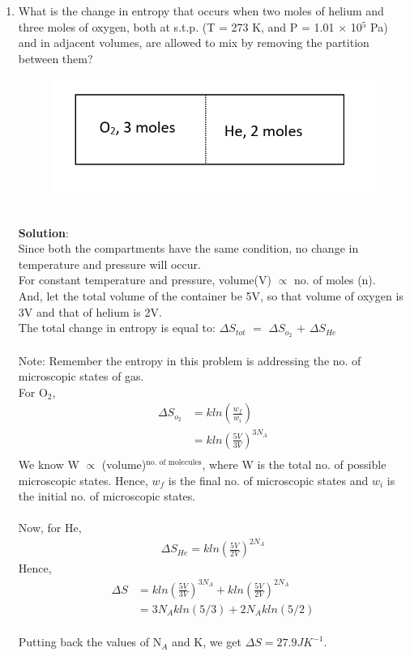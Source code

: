 \begin{enumerate}
\item What is the change in entropy that occurs when two moles of helium and three moles of oxygen, both at s.t.p. (T = 273 K, and P = 1.01 $\times$ 10$^5$ Pa) and in adjacent volumes, are allowed to mix by removing the partition between them? \\
\begin{figure}[htp]
    \centering
    \includegraphics{figures/thermo/thermo3.2.PNG}
    \caption{}
    \label{fig:thermo3.2}
\end{figure}
\\
\textbf{Solution}:\\
Since both the compartments have the same condition, no change in temperature and pressure will occur. \\
For constant temperature and pressure, volume(V) $\propto$ no. of moles (n).\\ 
And, let the total volume of the container be 5V, so that volume of oxygen is 3V and that of helium is 2V. \\
The total change in entropy is equal to:
$\Delta S_{tot}$ $=$ $\Delta$$S_{o_2}$ $+$ $\Delta S_{He}$\\\\
Note: Remember the entropy in this problem is addressing the no. of microscopic states of gas.\\
For O$_2$, \\
\begin{align*}
    \Delta S_{o_2}
    &= kln\left(\frac{w_f}{w_i}\right)\\
    &= kln\left(\frac{5V}{3V}\right)^{3N_A}\\
\end{align*}
We know W $\propto$ (volume)$^\text{no. of molecules}$, where W is the total no. of possible microscopic states. Hence, $w_f$ is the final no. of microscopic states and $w_i$ is the initial no. of microscopic states.\\\\
Now, for He, \\
\begin{align*}
    \Delta S_{He} = kln\left(\frac{5V}{2V}\right)^{2N_A}
\end{align*}
Hence, 
\begin{align*}
    \Delta S &= kln\left(\frac{5V}{3V}\right)^{3N_A} + kln\left(\frac{5V}{2V}\right)^{2N_A}\\
    &=  3N_A k ln(5/3) + 2N_A k ln(5/2)
\end{align*}\\
Putting back the values of N$_A$ and K, we get $\Delta S = 27.9 JK^{-1}$. 


\end{enumerate}
